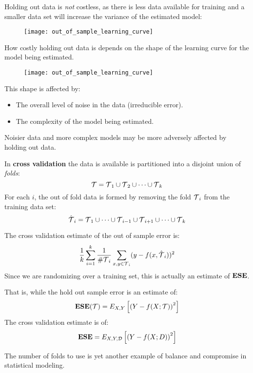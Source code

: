 %
%
\begin{frame}
  Holding out data is \textit{not} costless, as there is less data available for
  training and a smaller data set will increase the variance of the estimated
  model:
  \begin{figure}
    \texttt{[image: out\_of\_sample\_learning\_curve]}
  \end{figure}
  How costly holding out data is depends on the shape of the learning curve for
  the model being estimated.
\end{frame}
%
%
\begin{frame}
  \begin{figure}
    \texttt{[image: out\_of\_sample\_learning\_curve]}
  \end{figure}
  This shape is affected by:
  \begin{itemize}
    \item The overall level of noise in the data (irreducible error).
    \item The complexity of the model being estimated.
  \end{itemize}
  Noisier data and more complex models may be more adversely affected by holding
  out data.
\end{frame}
%
%
\begin{frame}
  In \textbf{cross validation} the data is available is partitioned into a
  disjoint union of \textit{folds}:
  $$ {\operatorname*{\mathcal{T}}} = {\operatorname*{\mathcal{T}}}_1 \cup {\operatorname*{\mathcal{T}}}_2 \cup \cdots \cup {\operatorname*{\mathcal{T}}}_k $$
  For each $i$, the out of fold data is formed by removing the fold ${\operatorname*{\mathcal{T}}}_i$ from
  the training data set:
  $$ \hat{{\operatorname*{\mathcal{T}}}}_i = {\operatorname*{\mathcal{T}}}_1 \cup \cdots \cup {\operatorname*{\mathcal{T}}}_{i-1} \cup {\operatorname*{\mathcal{T}}}_{i+1}
  \cup \cdots \cup {\operatorname*{\mathcal{T}}}_k $$
\end{frame}
%
%
\begin{frame}
  The cross validation estimate of the out of sample error is:
   $$ \frac{1}{k} \sum_{i=1}^{k} \frac{1}{\# {\operatorname*{\mathcal{T}}}_i } \sum_{x,y \in
   {\operatorname*{\mathcal{T}}}_i} (y - f(x, \hat{{\operatorname*{\mathcal{T}}}}_i))^2$$ 
   Since we are randomizing over a training set, this is actually an estimate of
   $\operatorname*{\mathbf{ESE}}$.
\end{frame}
%
%
\begin{frame}
  That is, while the hold out sample error is an estimate of:
  $$\operatorname*{\mathbf{ESE}}(\operatorname*{\mathcal{T}}) = E_{X,Y} \left[ \left( Y - f(X; \operatorname*{\mathcal{T}}) \right)^2 \right]$$
  The cross validation estimate is of:
  $$\operatorname*{\mathbf{ESE}} = E_{X,Y,\operatorname*{\mathcal{D}}} \left[ \left( Y - f(X; D) \right)^2 \right]$$
\end{frame}
%
%
\begin{frame}
  The number of folds to use is yet another example of balance and compromise in
  statistical modeling.
\end{frame}
